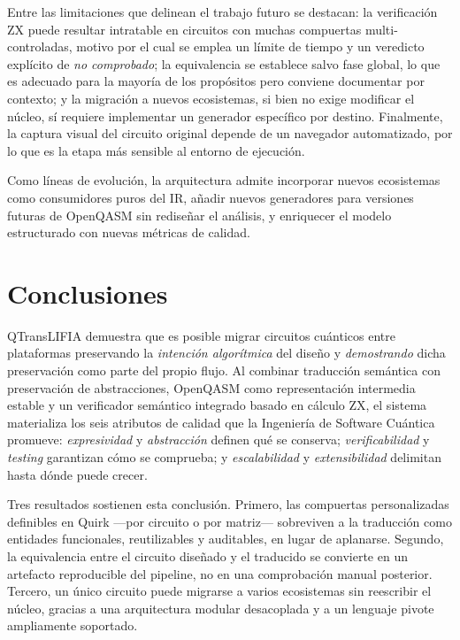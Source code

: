 \documentclass[11pt,a4paper]{article}
\begin{document}
Entre las limitaciones que delinean el trabajo futuro se destacan: la verificación ZX puede
resultar intratable en circuitos con muchas compuertas multi-controladas, motivo por el cual
se emplea un límite de tiempo y un veredicto explícito de \emph{no comprobado}; la
equivalencia se establece salvo fase global, lo que es adecuado para la mayoría de los
propósitos pero conviene documentar por contexto; y la migración a nuevos ecosistemas, si
bien no exige modificar el núcleo, sí requiere implementar un generador específico por
destino. Finalmente, la captura visual del circuito original depende de un navegador
automatizado, por lo que es la etapa más sensible al entorno de ejecución.

Como líneas de evolución, la arquitectura admite incorporar nuevos ecosistemas como
consumidores puros del IR, añadir nuevos generadores para versiones futuras de OpenQASM sin
rediseñar el análisis, y enriquecer el modelo estructurado con nuevas métricas de calidad.

\section{Conclusiones}
\label{sec:conclusiones}

QTransLIFIA demuestra que es posible migrar circuitos cuánticos entre plataformas
preservando la \emph{intención algorítmica} del diseño y \emph{demostrando} dicha
preservación como parte del propio flujo. Al combinar traducción semántica con preservación
de abstracciones, OpenQASM como representación intermedia estable y un verificador
semántico integrado basado en cálculo ZX, el sistema materializa los seis atributos de
calidad que la Ingeniería de Software Cuántica promueve: \emph{expresividad} y
\emph{abstracción} definen qué se conserva; \emph{verificabilidad} y \emph{testing}
garantizan cómo se comprueba; y \emph{escalabilidad} y \emph{extensibilidad} delimitan hasta
dónde puede crecer.

Tres resultados sostienen esta conclusión. Primero, las compuertas personalizadas definibles
en Quirk ---por circuito o por matriz--- sobreviven a la traducción como entidades
funcionales, reutilizables y auditables, en lugar de aplanarse. Segundo, la equivalencia
entre el circuito diseñado y el traducido se convierte en un artefacto reproducible del
pipeline, no en una comprobación manual posterior. Tercero, un único circuito puede
migrarse a varios ecosistemas sin reescribir el núcleo, gracias a una arquitectura modular
desacoplada y a un lenguaje pivote ampliamente soportado.
\end{document}
